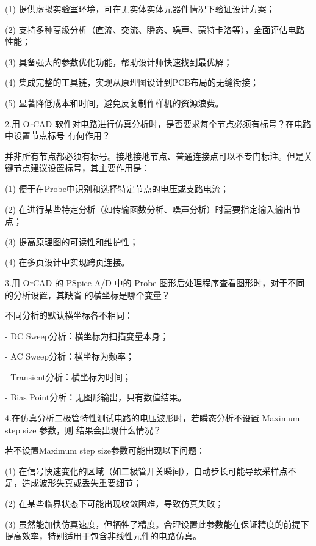 \documentclass[12pt,a4paper]{article}
\begin{document}
(1) 提供虚拟实验室环境，可在无实体实体元器件情况下验证设计方案；

(2) 支持多种高级分析（直流、交流、瞬态、噪声、蒙特卡洛等），全面评估电路性能；

(3) 具备强大的参数优化功能，帮助设计师快速找到最优解；

(4) 集成完整的工具链，实现从原理图设计到PCB布局的无缝衔接；

(5) 显著降低成本和时间，避免反复制作样机的资源浪费。

2.用 OrCAD 软件对电路进行仿真分析时，是否要求每个节点必须有标号？在电路中设置节点标号
有何作用？

并非所有节点都必须有标号。接地接地节点、普通连接点可以不专门标注。但是关键节点建议设置标号，其主要作用是：

(1) 便于在Probe中识别和选择特定节点的电压或支路电流；

(2) 在进行某些特定分析（如传输函数分析、噪声分析）时需要指定输入输出节点；

(3) 提高原理图的可读性和维护性；

(4) 在多页设计中实现跨页连接。

3.用 OrCAD 的 PSpice A/D 中的 Probe 图形后处理程序查看图形时，对于不同的分析设置，其缺省
的横坐标是哪个变量？

不同分析的默认横坐标各不相同：

- DC Sweep分析：横坐标为扫描变量本身；

- AC Sweep分析：横坐标为频率；

- Transient分析：横坐标为时间；

- Bias Point分析：无图形输出，只有数值结果。

4.在仿真分析二极管特性测试电路的电压波形时，若瞬态分析不设置 Maximum step size 参数，则
结果会出现什么情况？

若不设置Maximum step size参数可能出现以下问题：

(1) 在信号快速变化的区域（如二极管开关瞬间），自动步长可能导致采样点不足，造成波形失真或丢失重要细节；

(2) 在某些临界状态下可能出现收敛困难，导致仿真失败；

(3) 虽然能加快仿真速度，但牺牲了精度。合理设置此参数能在保证精度的前提下提高效率，特别适用于包含非线性元件的电路仿真。
\end{document}
